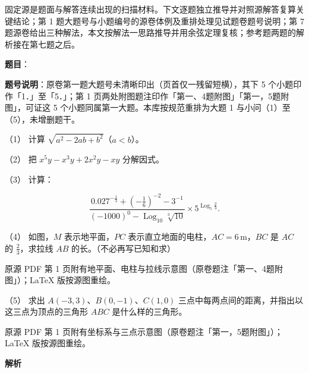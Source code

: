 

\begin{gktip}
固定源是题面与解答连续出现的扫描材料。下文逐题独立推导并对照源解答复算关键结论；第 1 题大题号与小题编号的源卷体例及重排处理见试题卷题号说明；第 7 题源卷给出三种解法，本文按解法一思路推导并用余弦定理复核；参考题两题的解析接在第七题之后。
\end{gktip}

\begin{answer}

\textbf{题目}：

\begin{gktip}
\textbf{题号说明}：原卷第一题大题号未清晰印出（页首仅一残留短横），其下 5 个小题印作「1．」至「5．」；第 1 页两处附图题注印作「第一、4题附图」「第一，5题附图」，可证这 5 个小题同属第一大题。本库按规范重排为大题 1 与小问（1）至（5），未增删题干。
\end{gktip}

（1） 计算 $\sqrt{a^2-2ab+b^2}$（$a<b$）。

（2） 把 $x^5y-x^3y+2x^2y-xy$ 分解因式。

（3） 计算：

\nopagebreak[4]
\[
\frac{0.027^{-\frac13}+\left(-\frac16\right)^{-2}-3^{-1}}{(-1000)^0-\operatorname{Log}_{10}\sqrt[3]{10}}\times 5^{\operatorname{Log}_5\frac23}.
\]

（4） 如图，$M$ 表示地平面，$PC$ 表示直立地面的电柱，$AC=6\,\mathrm{m}$，$BC$ 是 $AC$ 的 $\frac23$，求拉线 $AB$ 的长。（不必再写已知和求）

\begin{gktip}
原源 PDF 第 1 页附有地平面、电柱与拉线示意图（原卷题注「第一、4题附图」）；LaTeX 版按源图重绘。
\end{gktip}
\nopagebreak[4]
\begin{center}\end{center}
\nopagebreak[4]
（5） 求出 $A(-3,3)$、$B(0,-1)$、$C(1,0)$ 三点中每两点间的距离，并指出以这三点为顶点的三角形 $ABC$ 是什么样的三角形。

\begin{gktip}
原源 PDF 第 1 页附有坐标系与三点示意图（原卷题注「第一，5题附图」）；LaTeX 版按源图重绘。
\end{gktip}
\nopagebreak[4]
\begin{center}\end{center}
\nopagebreak[4]
\textbf{解析}


\end{answer}
